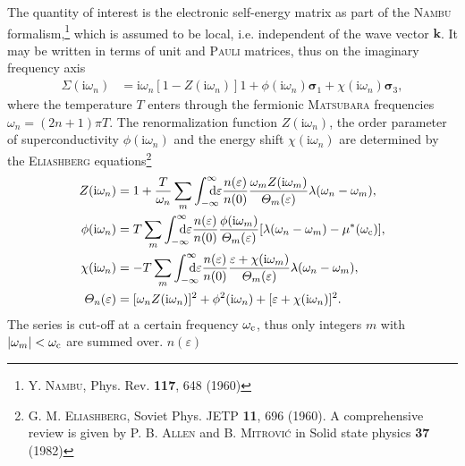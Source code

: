\documentclass[twocolumn]{article}
\def\D{\mathrm d}
\def\I{\mathrm i}
\def\sub#1{\sb{\mathrm{#1}}}
\def\from#1{\sb{\mathrlap{#1}}}
\def\till#1{\sp{\mathrlap{#1}}}
\let\vec\boldsymbol
\let\epsilon\varepsilon
\let\Sigma\varSigma
\let\Theta\varTheta
\let\vol\textbf
\let\name\textsc
\begin{document}
   The quantity of interest is the  electronic self-energy matrix as part of the
   \name{Nambu} formalism,\footnote{Y.  \name{Nambu}, Phys. Rev.  \vol{117}, 648
   (1960)} which  is assumed to  be local, i.e.  independent of the  wave vector
   $\vec k$. It may be written in  terms of unit and \name{Pauli} matrices, thus
   on the imaginary frequency axis
   \begin{align*}
      \vec \Sigma(\I \omega_n) &=
      \I \omega_n [1 - Z(\I \omega_n)] \vec{\mathit 1}
      + \phi(\I \omega_n) \vec \sigma_1
      + \chi(\I \omega_n) \vec \sigma_3,
   \end{align*}
   where  the temperature  $T$ enters  through the  fermionic \name{Matsu\-bara}
   frequencies $\omega_n = (2 n +  1) \pi T$. The renormalization function $Z(\I
   \omega_n)$, the order parameter  of superconductivity $\phi(\I \omega_n)$ and
   the energy shift $\chi(\I \omega_n)$  are determined by the \name{Eliashberg}
   equations\footnote{G. M.  \name{Eliashberg}, Soviet Phys. JETP  \vol{11}, 696
   (1960).  A  comprehensive review  is  given  by  P.  B. \name{Allen}  and  B.
   \name{Mitrović} in Solid state physics \vol{37} (1982)}
   \begin{align}
      \begin{split}
         Z(\I \omega_n) &= 1 + \frac T {\omega_n} \sum_m
         \int \from{-\infty} \till \infty \D \epsilon \frac{n(\epsilon)}{n(0)}
         \frac{\omega_m Z (\I \omega_m)}{\Theta_m(\epsilon)}
         \lambda(\omega_n - \omega_m),
         \\
         \phi(\I \omega_n) &= T \sum_m
         \int \from{-\infty} \till \infty \D \epsilon \frac{n(\epsilon)}{n(0)}
         \frac{\phi(\I \omega_m)}{\Theta_m(\epsilon)}
         [\lambda(\omega_n - \omega_m) - \mu^*(\omega \sub c)],
         \\
         \chi(\I \omega_n) &= -T \sum_m
         \int \from{-\infty} \till \infty \D \epsilon \frac{n(\epsilon)}{n(0)}
         \frac{\epsilon + \chi(\I \omega_m)}{\Theta_m(\epsilon)}
         \lambda(\omega_n - \omega_m),
         \\
         \Theta_n(\epsilon) &= [\omega_n Z(\I \omega_n)]^2
         + \phi^2(\I \omega_n) + [\epsilon + \chi(\I \omega_n)]^2.
      \end{split}
      \label{Eliashberg full}
   \end{align}
   The  series is  cut-off at  a certain  frequency $\omega  \sub c$,  thus only
   integers $m$ with $|\omega_m| < \omega \sub c$ are summed over. $n(\epsilon)$
\end{document}
